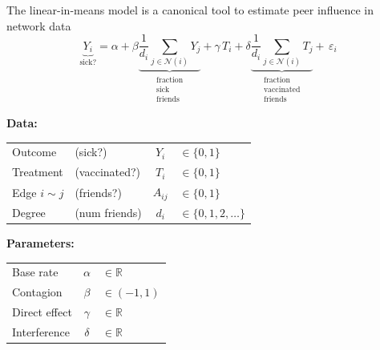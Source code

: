 \documentclass[final]{beamer}
\newcommand{\Ni}{\mathcal N(i)}
\newcommand{\R}{\mathbb{R}}
\newlength{\colwidth}
\begin{document}
\begin{frame}[t]
\begin{columns}[t]
\begin{column}{\colwidth}
            \begin{block}{The linear-in-means model is a canonical tool to estimate peer influence in network data}
                \begin{equation*}
                    \underbrace{Y_i}_\text{sick?} =
                    \alpha +
                    \beta \underbrace{\frac{1}{d_i}\sum_{j \in \Ni} Y_j}_{\substack{\text{fraction} \\ \text{sick} \\ \text{friends}}} +
                    \gamma \, T_i +
                    \delta \underbrace{\frac{1}{d_i}\sum_{j \in \Ni} T_j}_{\substack{\text{fraction} \\ \text{vaccinated} \\ \text{friends}}} + \,
                    \varepsilon_i
                \end{equation*}

                \begin{minipage}{.5\textwidth}
                    \textbf{Data:}
                    \vspace{3mm}
                    \begin{table}[]
                        \begin{tabular}{llcl}
                            Outcome         & (sick?)       & $Y_i$    & $\in \{0, 1\}$           \\
                            Treatment       & (vaccinated?) & $T_i$    & $\in \{0, 1\}$           \\
                            Edge $i \sim j$ & (friends?)    & $A_{ij}$ & $\in \{0, 1\}$           \\
                            Degree          & (num friends) & $d_i$    & $\in \{0, 1, 2, \dots\}$
                        \end{tabular}
                    \end{table}
                \end{minipage}
                \begin{minipage}{.5\textwidth}
                    \textbf{Parameters:}
                    \vspace{3mm}
                    \begin{table}[]
                        \begin{tabular}{lcl}
                            Base rate     & $\alpha$ & $\in \R$      \\
                            Contagion     & $\beta$  & $\in (-1, 1)$ \\
                            Direct effect & $\gamma$ & $\in \R$      \\
                            Interference  & $\delta$ & $\in \R$
                        \end{tabular}
                    \end{table}
                \end{minipage}


\end{block}
\end{column}
\end{columns}
\end{frame}
\end{document}
